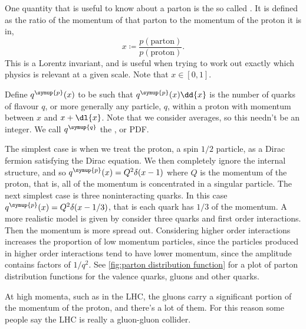 \documentclass[fleqn]{NotesClass}
\newcommand{\Pparticle}[1]{\symup{#1}}
\newcommand{\Pq}{\ensuremath{\Pparticle{q}}}
\newcommand{\Pp}{\ensuremath{\Pparticle{p}}}
\begin{document}
    One quantity that is useful to know about a parton is the so called .
    It is defined as the ratio of the momentum of that parton to the momentum of the proton it is in,
    \begin{equation}
        x \coloneqq \frac{p(\text{parton})}{p(\text{proton})}.
    \end{equation}
    This is a Lorentz invariant, and is useful when trying to work out exactly which physics is relevant at a given scale.
    Note that \(x \in [0, 1]\).
    
    Define \(q^{\Pp}(x)\) to be such that \(q^{\Pp}(x)\dd{x}\) is the number of quarks of flavour \(q\), or more generally any particle, \(q\), within a proton with momentum between \(x\) and \(x + \dl{x}\).
    Note that we consider averages, so this needn't be an integer.
    We call \(q^{\Pq}\) the , or PDF.
    
    The simplest case is when we treat the proton, a spin \(1/2\) particle, as a Dirac fermion satisfying the Dirac equation.
    We then completely ignore the internal structure, and so \(q^{\Pp}(x) = Q^2\delta(x - 1)\) where \(Q\) is the momentum of the proton, that is, all of the momentum is concentrated in a singular particle.
    The next simplest case is three noninteracting quarks.
    In this case \(q^{\Pp}(x) = Q^2\delta(x - 1/3)\), that is each quark has \(1/3\) of the momentum.
    A more realistic model is given by consider three quarks and first order interactions.
    Then the momentum is more spread out.
    Considering higher order interactions increases the proportion of low momentum particles, since the particles produced in higher order interactions tend to have lower momentum, since the amplitude contains factors of \(1/q^2\).
    See \cref{fig:parton distribution function} for a plot of parton distribution functions for the valence quarks, gluons and other quarks.
    
    At high momenta, such as in the LHC, the gluons carry a significant portion of the momentum of the proton, and there's a lot of them.
    For this reason some people say the LHC is really a gluon-gluon collider.
    
\end{document}
